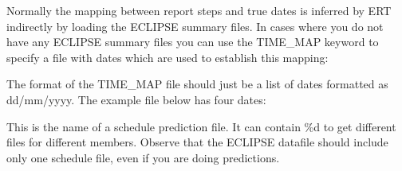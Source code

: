 \documentclass[letterpaper,10pt,english]{sphinxmanual}
\begin{document}
\label{\detokenize{keywords/index:time-map}}
\begin{sphinxShadowBox}

Normally the mapping between report steps and true dates is inferred by
ERT indirectly by loading the ECLIPSE summary files. In cases where you
do not have any ECLIPSE summary files you can use the TIME\_MAP keyword
to specify a file with dates which are used to establish this mapping:


%
\begin{sphinxVerbatim}[commandchars=\\\{\}]
         
 
\end{sphinxVerbatim}

The format of the TIME\_MAP file should just be a list of dates formatted as
dd/mm/yyyy. The example file below has four dates:

%
\begin{sphinxVerbatim}[commandchars=\\\{\}]
\end{sphinxVerbatim}
\end{sphinxShadowBox}
\label{\detokenize{keywords/index:schedule-prediction-file}}
\begin{sphinxShadowBox}

This is the name of a schedule prediction file. It can contain \%d to get
different files for different members. Observe that the ECLIPSE datafile
should include only one schedule file, even if you are doing predictions.
\end{sphinxShadowBox}
\end{document}
